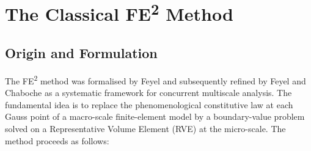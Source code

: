 \section{The Classical FE\textsuperscript{2} Method}
\label{sec:ms-fe2-review}

\subsection{Origin and Formulation}

The FE\textsuperscript{2} method was formalised by
Feyel \cite{Feyel1999} and subsequently refined by
Feyel and Chaboche \cite{FeyelandChaboche2000} as a systematic
framework for concurrent multiscale analysis.  The fundamental idea
is to replace the phenomenological constitutive law at each Gauss
point of a macro-scale finite-element model by a boundary-value
problem solved on a Representative Volume Element (RVE) at the
micro-scale.  The method proceeds as follows:

